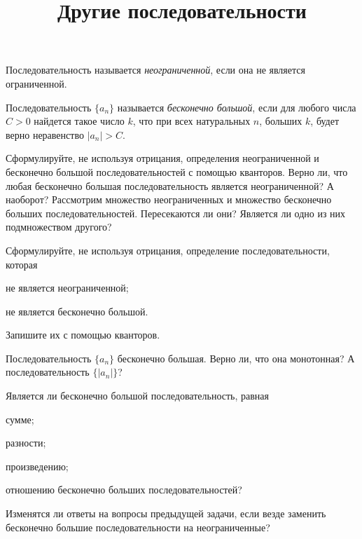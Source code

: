 \documentclass[a4paper, 12pt, num=25]{listok}
\begin{document}
\title{Другие последовательности}
\maketitle{}
\begin{definition}
	Последовательность называется \textit{неограниченной}, если она не является ограниченной.
\end{definition}
\begin{definition}
	Последовательность $\{a_n\}$ называется \textit{бесконечно большой}, если для любого числа $C > 0$ найдется такое число $k$,
	что при всех натуральных $n$, больших $k$, будет верно неравенство $|a_n| > C$.
\end{definition}
\begin{problem}
	Сформулируйте, не используя отрицания, определения неограниченной и бесконечно большой последовательностей с помощью кванторов.
	Верно ли, что любая бесконечно большая последовательность является неограниченной? А наоборот?
	Рассмотрим множество неограниченных и множество бесконечно больших последовательностей. Пересекаются ли они?
	Является ли одно из них подмножеством другого?
\end{problem}
\begin{problem}
	Сформулируйте, не используя отрицания, определение последовательности, которая
	\begin{probparts}
		\item не является неограниченной;
		\item не является бесконечно большой.
	\end{probparts}
	Запишите их с помощью кванторов.
\end{problem}
\begin{problem}
	Последовательность $\{a_n\}$ бесконечно большая. Верно ли, что она монотонная?
	А последовательность $\{|a_n|\}$?
\end{problem}
\begin{problem}
	Является ли бесконечно большой последовательность, равная
	\begin{probparts}
		\item сумме;
		\item разности;
		\item произведению;
		\item отношению бесконечно больших последовательностей?
	\end{probparts}
\end{problem}
\begin{problem}
	Изменятся ли ответы на вопросы предыдущей задачи, если везде заменить бесконечно большие последовательности на неограниченные?
\end{problem}
\end{document}
